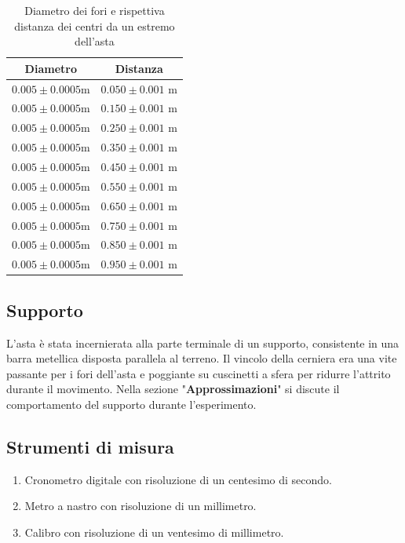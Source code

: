 \documentclass[11pt]{article}
\begin{document}
\begin{table}
    \centering
\caption{Diametro dei fori e rispettiva distanza dei centri da un estremo dell'asta}
    \label{tab:lunghezza-asta}
    \begin{tabular}{|c|c|}
        \hline
        Diametro & Distanza\\
        \hline
         $0.005 \pm 0.0005$m & $0.050 \pm 0.001$ m \\
        $0.005 \pm 0.0005$m & $0.150 \pm 0.001$ m \\
        $0.005 \pm 0.0005$m & $0.250\pm 0.001$ m \\
        $0.005 \pm 0.0005$m & $0.350 \pm 0.001$ m \\
        $0.005 \pm 0.0005$m & $0.450 \pm 0.001$ m \\
        $0.005 \pm 0.0005$m  & $0.550 \pm 0.001$ m \\
        $0.005 \pm 0.0005$m & $0.650 \pm 0.001$ m \\
       $0.005 \pm 0.0005$m & $0.750 \pm 0.001$ m \\
       $0.005 \pm 0.0005$m & $0.850 \pm 0.001$ m \\
        $0.005 \pm 0.0005$m & $0.950 \pm 0.001$ m \\
        \hline
    \end{tabular}
\end{table}

\subsection{Supporto}
L'asta è stata incernierata alla parte terminale di un supporto, consistente in una barra metellica disposta parallela al terreno. 
Il vincolo della cerniera era una vite passante per i fori dell'asta e poggiante su cuscinetti a sfera per ridurre l'attrito durante il movimento.
Nella sezione "\textbf{Approssimazioni}"  si discute il comportamento del supporto durante l'esperimento.


\subsection{Strumenti di misura}
\begin{enumerate}
\item Cronometro digitale con risoluzione di un centesimo di secondo.
\item Metro a nastro con risoluzione di un millimetro.
\item Calibro con risoluzione di un ventesimo di millimetro.

\end{enumerate}
\end{document}

